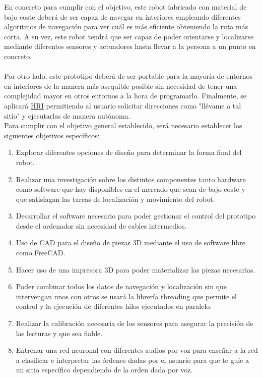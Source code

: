En concreto para cumplir con el objetivo, este robot fabricado con material de bajo coste deberá de ser capaz de navegar en interiores empleando diferentes algoritmos de navegación para ver cuál es más eficiente obteniendo la ruta más corta. A su vez, este robot tendrá que ser capaz de poder orientarse y localizarse mediante diferentes sensores y actuadores hasta llevar a la persona a un punto en concreto.\\ \\
Por otro lado, este prototipo deberá de ser portable para la mayoría de entornos en interiores de la manera más asequible posible sin necesidad de 
tener una complejidad mayor en otros entornos a la hora de programarlo. Finalmente, se aplicará \hyperlink{HRI}{HRI} permitiendo al usuario solicitar direcciones como "llévame a tal sitio" y ejecutarlas de manera autónoma.   \\

Para cumplir con el objetivo general establecido, será necesario establecer los siguientes objetivos específicos:


\begin{enumerate}
 \item Explorar diferentes opciones de diseño para determinar la forma final del robot.
 \item Realizar una investigación sobre los distintos componentes tanto hardware como software que hay disponibles en el mercado que sean 
de bajo coste y que satisfagan las tareas de localización y movimiento del robot.
 \item Desarrollar el software necesario para poder gestionar el control del prototipo desde el ordenador sin necesidad de cables intermedios.
 \item Uso de \hyperlink{CAD}{CAD} para el diseño de piezas 3D mediante el uso de software libre como FreeCAD.
 \item Hacer uso de una impresora 3D para poder materializar las piezas necesarias. 
 \item Poder combinar todos los datos de navegación y localización sin que intervengan unos con otros se usará la librería threading que permite el control y la ejecución de diferentes hilos  ejecutados en paralelo.
 \item Realizar la calibración necesaria de los sensores para asegurar la precisión de las lecturas y que sea fiable.
 \item Entrenar una red neuronal con diferentes audios por voz para enseñar a la red a clasificar e interpretar las órdenes dadas por el usuario para
 que te guíe a un sitio específico dependiendo de la orden dada por voz.
\end{enumerate}\


